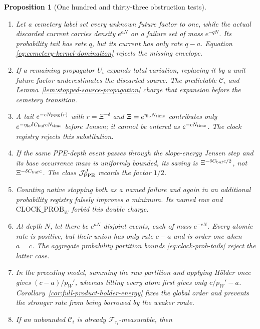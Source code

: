 \documentclass[11pt]{article}
\newtheorem{proposition}[theorem]{Proposition}
\begin{document}
\begin{proposition}[One hundred and thirty-three obstruction tests]
\begin{enumerate}[label=\textup{(T\arabic*)}]
      taking $s\to0$.  The positive coarea estimate
      \eqref{eq:face-middle-per-depth} and
      $\mathrm{FACE}_{\rm 2CUT}$ explicitly forbid this factor.
\item Let a cemetery label set every unknown future factor to one, while the
      actual discarded current carries density $e^{aN}$ on a failure set of
      mass $e^{-qN}$.  Its probability tail has rate $q$, but its current
      has only rate $q-a$.  Equation \eqref{eq:cemetery-kernel-domination}
      rejects the missing envelope.
\item If a remaining propagator $U_i$ expands total variation, replacing it
      by a unit future factor underestimates the discarded source.  The
      predictable $\mathcal C_i$ and
      Lemma~\ref{lem:stopped-source-propagation} charge that expansion before
      the cemetery transition.
\item A tail $e^{-cN_{\rm PPE}(r)}$ with $r=\Xi^{-\delta}$ and
      $\Xi=e^{\eta_{\rm lo}N_{\rm time}}$ contributes only
      $e^{-\eta_{\rm lo}\delta C_{\rm buf}cN_{\rm time}}$ before Jensen; it
      cannot be entered as $e^{-cN_{\rm time}}$.  The clock registry rejects
      this substitution.
\item If the same PPE-depth event passes through the slope-energy Jensen
      step and its base occurrence mass is uniformly bounded, its saving is
      $\Xi^{-\delta C_{\rm buf}c/2}$, not
      $\Xi^{-\delta C_{\rm buf}c}$.  The class
      $\mathcal J_{\rm PPE}^{J}$ records the factor $1/2$.
\item Counting native stopping both as a named failure and again in an
      additional probability registry falsely improves a minimum.  Its
      named row and \(\mathrm{CLOCK\_PROB}_{W}\) forbid this double charge.
\item At depth $N$, let there be $e^{aN}$ disjoint events, each of mass
      $e^{-cN}$.  Every atomic rate is positive, but their union has only
      rate $c-a$ and is order one when $a=c$.  The aggregate probability
      partition bounds \eqref{eq:clock-prob-tails} reject the latter case.
\item In the preceding model, summing the raw partition and applying
      H\"older once gives $(c-a)/p_W'$, whereas tilting every atom first gives
      only $c/p_W'-a$.  Corollary~\ref{cor:full-product-holder-energy}
      fixes the global order and prevents the stronger rate from being
      borrowed by the weaker route.
\item If an unbounded $\mathcal C_i$ is already
      $\mathcal F_{\tau_i}$-measurable, then

\end{enumerate}
\end{proposition}
\end{document}
